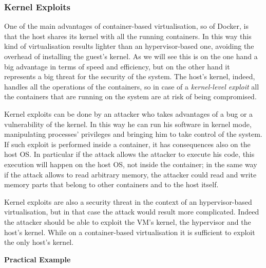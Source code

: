 \documentclass[a4paper,12pt]{article}
\begin{document}
\subsubsection{Kernel Exploits}

One of the main advantages of container-based virtualisation, so of Docker, is
that the host shares its kernel with all the running containers. In this way
this kind of virtualisation results lighter than an hypervisor-based one,
avoiding the overhead of installing the guest's kernel. As we will see this is
on the one hand a big advantage in terms of speed and efficiency, but on the
other hand it represents a big threat for the security of the system. The host's
kernel, indeed, handles all the operations of the containers, so in case of a
\textit{kernel-level exploit} all the containers that are running on the system
are at risk of being compromised.\par Kernel exploits can be done by an attacker
who takes advantages of a bug or a vulnerability of the kernel. In this way he
can run his software in kernel mode, manipulating processes' privileges and
bringing him to take control of the system. If such exploit is performed inside
a container, it has consequences also on the host OS. In particular if the
attack allows the attacker to execute his code, this execution will happen on
the host OS, not inside the container; in the same way if the attack allows to
read arbitrary memory, the attacker could read and write memory parts that
belong to other containers and to the host itself.\par Kernel exploits are also
a security threat in the context of an hypervisor-based virtualisation, but in
that case the attack would result more complicated. Indeed the attacker should
be able to exploit the VM's kernel, the hypervisor and the host's kernel. While
on a container-based virtualisation it is sufficient to exploit the only host's
kernel.

\bigbreak\textbf{Practical Example}\bigbreak 
\end{document}
